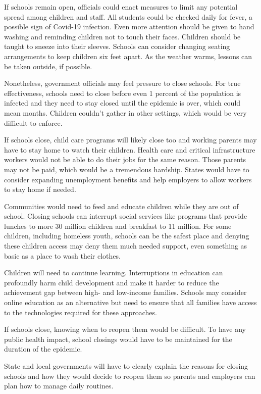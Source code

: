 If schools remain open, officials could enact measures to limit any
potential spread among children and staff. All students could be checked
daily for fever, a possible sign of Covid-19 infection. Even more
attention should be given to hand washing and reminding children not to
touch their faces. Children should be taught to sneeze into their
sleeves. Schools can consider changing seating arrangements to keep
children six feet apart. As the weather warms, lessons can be taken
outside, if possible.

Nonetheless, government officials may feel pressure to close schools.
For true effectiveness, schools need to close before even 1 percent of
the population is infected and they need to stay closed until the
epidemic is over, which could mean months. Children couldn't gather in
other settings, which would be very difficult to enforce.

If schools close, child care programs will likely close too and working
parents may have to stay home to watch their children. Health care and
critical infrastructure workers would not be able to do their jobs for
the same reason. Those parents may not be paid, which would be a
tremendous hardship. States would have to consider expanding
unemployment benefits and help employers to allow workers to stay home
if needed.

Communities would need to feed and educate children while they are out
of school. Closing schools can interrupt social services like programs
that provide lunches to more 30 million children and breakfast to 11
million. For some children, including homeless youth, schools can be the
safest place and denying these children access may deny them much needed
support, even something as basic as a place to wash their clothes.

Children will need to continue learning. Interruptions in education can
profoundly harm child development and make it harder to reduce the
achievement gap between high- and low-income families. Schools may
consider online education as an alternative but need to ensure that all
families have access to the technologies required for these approaches.

If schools close, knowing when to reopen them would be difficult. To
have any public health impact, school closings would have to be
maintained for the duration of the epidemic.

State and local governments will have to clearly explain the reasons for
closing schools and how they would decide to reopen them so parents and
employers can plan how to manage daily routines.

